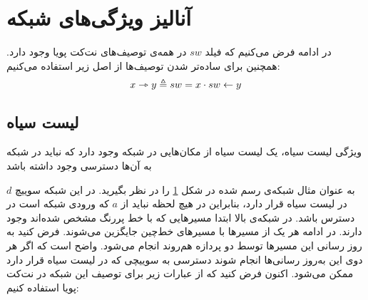 \section{آنالیز ویژگی‌های شبکه}
در ادامه فرض‌ می‌کنیم که فیلد
$sw$
در همه‌ی توصیف‌های نت‌کت پویا وجود دارد.
همچنین برای ساده‌تر شدن توصیف‌ها از اصل زیر استفاده می‌کنیم:
\begin{equation*}
    x \rightarrowtriangle y \triangleq sw = x \cdot sw \leftarrow y
\end{equation*}

\subsection{لیست‌ سیاه}
ویژگی لیست‌ سیاه، یک لیست‌ سیاه
از مکان‌هایی در شبکه وجود دارد که نباید در شبکه به آن‌ها دسترسی وجود داشته باشد
\cite{network-abstractions}
\begin{figure}
    \centering
    \caption{ }
    \label{fig:blacklist}
\end{figure}
به عنوان مثال شبکه‌ی رسم شده در شکل
\ref{fig:blacklist}
را در نظر بگیرید.
در این شبکه سوییچ
$d$
در لیست‌ سیاه قرار دارد، بنابراین در هیچ لحظه نباید از
$a$
که ورودی شبکه است در دسترس باشد.
در شبکه‌ی بالا ابتدا مسیر‌هایی که با خط پررنگ مشخص شده‌اند وجود دارند.
در ادامه هر یک از مسیرها با مسیر‌های خط‌چین جایگزین می‌شوند.
فرض کنید به روز رسانی این مسیر‌ها توسط دو پردازه هم‌روند انجام می‌شود.
واضح است که اگر هر دوی این به‌روز رسانی‌ها انجام شوند دسترسی به سوییچی که در لیست سیاه قرار دارد ممکن می‌شود.
اکنون فرض کنید که از عبارات زیر برای توصیف این شبکه در نت‌کت پویا استفاده کنیم:
